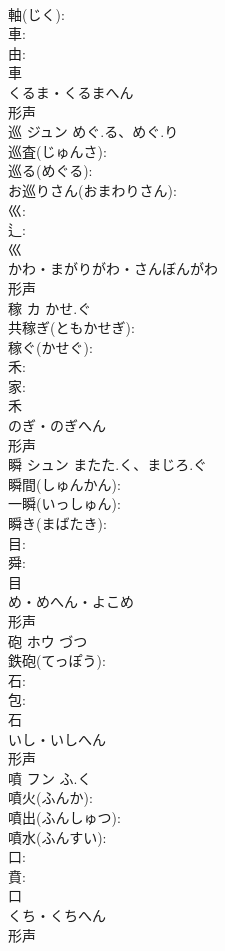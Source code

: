 \documentclass[8pt]{extreport}
\begin{document}
\begin{CJK}{UTF8}{min}
\\	軸(じく): 
\\	車: 
\\	由: 
\\	車	
\\	くるま・くるまへん	
\\	形声 
\\	巡	ジュン	めぐ.る、めぐ.り		
\\	巡査(じゅんさ): 
\\	巡る(めぐる): 
\\	お巡りさん(おまわりさん): 
\\	巛: 
\\	辶: 
\\	巛	
\\	かわ・まがりがわ・さんぼんがわ	
\\	形声 
\\	稼	カ	かせ.ぐ		
\\	共稼ぎ(ともかせぎ): 
\\	稼ぐ(かせぐ): 
\\	禾: 
\\	家: 
\\	禾	
\\	のぎ・のぎへん	
\\	形声 
\\	瞬	シュン	またた.く、まじろ.ぐ		
\\	瞬間(しゅんかん): 
\\	一瞬(いっしゅん): 
\\	瞬き(まばたき): 
\\	目: 
\\	舜: 
\\	目	
\\	め・めへん・よこめ	
\\	形声 
\\	砲	ホウ		づつ	
\\	鉄砲(てっぽう): 
\\	石: 
\\	包: 
\\	石	
\\	いし・いしへん	
\\	形声 
\\	噴	フン	ふ.く		
\\	噴火(ふんか): 
\\	噴出(ふんしゅつ): 
\\	噴水(ふんすい): 
\\	口: 
\\	賁: 
\\	口	
\\	くち・くちへん	
\\	形声 

\end{CJK}
\end{document}

